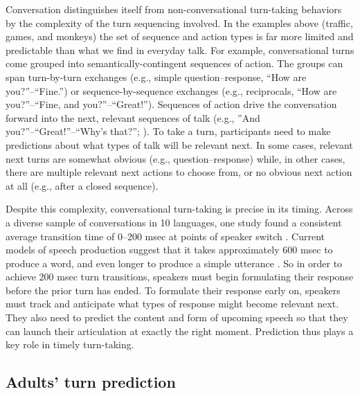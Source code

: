 \documentclass[authoryear, 12pt]{elsarticle}
\begin{document}
Conversation distinguishes itself from non-conversational turn-taking behaviors by the complexity of the turn sequencing involved. In the examples above (traffic, games, and monkeys) the set of sequence and action types is far more limited and predictable than what we find in everyday talk. For example, conversational turns come grouped into semantically-contingent sequences of action. The groups can span turn-by-turn exchanges (e.g., simple question--response, ``How are you?''--``Fine.'') or sequence-by-sequence exchanges (e.g., reciprocals, ``How are you?''--``Fine, and you?''--``Great!''). Sequences of action drive the conversation forward into the next, relevant sequences of talk (e.g., ''And you?''--``Great!''--``Why's that?''; \citealp{schegloff2007}). To take a turn, participants need to make predictions about what types of talk will be relevant next. In some cases, relevant next turns are somewhat obvious (e.g., question--response) while, in other cases, there are multiple relevant next actions to choose from, or no obvious next action at all (e.g., after a closed sequence).

Despite this complexity, conversational turn-taking is precise in its timing. Across a diverse sample of conversations in 10 languages, one study found a consistent average transition time of 0--200 msec at points of speaker switch \citep{stivers2009}. Current models of speech production suggest that it takes approximately 600 msec to produce a word, and even longer to produce a simple utterance \citep{levelt1989}. So in order to achieve 200 msec turn transitions, speakers must begin formulating their response before the prior turn has ended. To formulate their response early on, speakers must track and anticipate what types of response might become relevant next. They also need to predict the content and form of upcoming speech so that they can launch their articulation at exactly the right moment. Prediction thus plays a key role in timely turn-taking.

\subsection{Adults' turn prediction}
\end{document}
